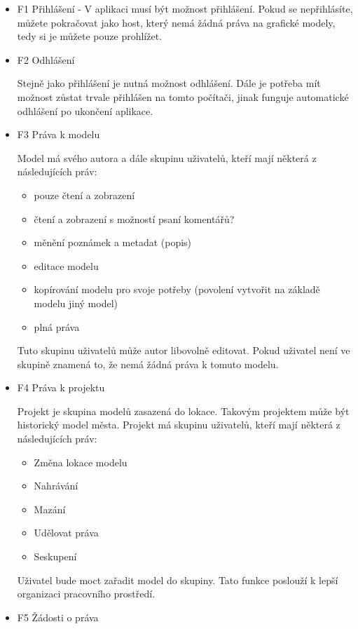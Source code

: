 \documentclass[thesis=B,czech]{FITthesis}[2012/06/26]
\begin{document}
            \begin{itemize}
                \item F1 Přihlášení - V aplikaci musí být možnost přihlášení. Pokud se nepřihlásíte, můžete pokračovat jako host, který nemá žádná práva na grafické modely, tedy si je můžete pouze prohlížet.
                \item F2 Odhlášení
                
                Stejně jako přihlášení je nutná možnost odhlášení. Dále je potřeba mít možnost zůstat trvale přihlášen na tomto počítači, jinak funguje automatické odhlášení po ukončení aplikace.
               \item F3 Práva k modelu
               
                Model má svého autora a dále skupinu uživatelů, kteří mají některá z následujících práv:
                \begin{itemize}
                    \item pouze čtení a zobrazení
                    \item čtení a zobrazení s možností psaní komentářů?
                    \item měnění poznámek a metadat (popis)
                    \item editace modelu
                    \item kopírování modelu pro svoje potřeby (povolení vytvořit na základě modelu jiný model)
                    \item plná práva
                \end{itemize}
                Tuto skupinu uživatelů může autor libovolně editovat. Pokud uživatel není ve skupině znamená to, že nemá žádná práva k tomuto modelu.
               \item F4 Práva k projektu
               
                Projekt je skupina modelů zasazená do lokace. Takovým projektem může být historický model města. Projekt má skupinu uživatelů, kteří mají některá z následujících práv:
                \begin{itemize}
                    \item Změna lokace modelu
                    \item Nahrávání
                    \item Mazání
                    \item Udělovat práva
                    \item Seskupení
                \end{itemize}
                Uživatel bude moct zařadit model do skupiny. Tato funkce poslouží k lepší organizaci pracovního prostředí.
                \item F5 Žádosti o práva
                

\end{itemize}
\end{document}
